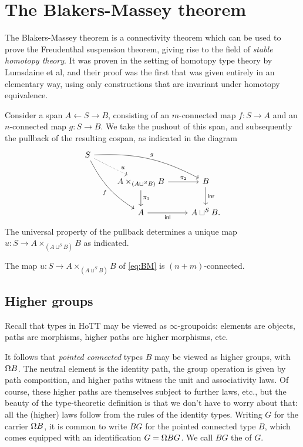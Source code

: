 
\section{The Blakers-Massey theorem}
The Blakers-Massey theorem is a connectivity theorem which can be used to prove the Freudenthal suspension theorem, giving rise to the field of \emph{stable homotopy theory}. It was proven in the setting of homotopy type theory by Lumsdaine et al, and their proof was the first that was given entirely in an elementary way, using only constructions that are invariant under homotopy equivalence. 

Consider a span $A \leftarrow S \rightarrow B$, consisting of an $m$-connected map $f:S\to A$ and an $n$-connected map $g:S\to B$. We take the pushout of this span, and subsequently the pullback of the resulting cospan, as indicated in the diagram
\begin{equation}\label{eq:BM}
\begin{tikzcd}
S \arrow[drr,bend left=15,"g"] \arrow[ddr,bend right=15,swap,"f"] \arrow[dr,densely dotted,"u" near end] \\
& A \times_{(A \sqcup^S B)} B \arrow[r,"\pi_2"] \arrow[d,"\pi_1"] & B \arrow[d,"\inr"] \\
& A \arrow[r,swap,"\inl"] & A \sqcup^S B.
\end{tikzcd}
\end{equation}
The universal property of the pullback determines a unique map $u:S\to A \times_{(A\sqcup^S B)} B$ as indicated.

\begin{thm}
The map $u:S\to A \times_{(A\sqcup^S B)} B$ of \cref{eq:BM} is $(n+m)$-connected.
\end{thm}

\subsection{Higher groups}
\label{sec:higher-groups}

Recall that types in HoTT may be viewed as $\infty$-groupoids:
elements are objects, paths are morphisms, higher paths are higher
morphisms, etc.

It follows that \emph{pointed connected} types $B$ may be viewed as higher
groups, with  $\Omega B$.
The neutral element is the identity path,
the group operation is given by path composition,
and higher paths witness the unit and associativity laws.
Of course, these higher paths are themselves subject to further laws,
etc., but the beauty of the type-theoretic definition is
that we don't have to worry about that:
all the (higher) laws follow from the rules of the identity types.
Writing $G$ for the carrier $\Omega B$, it is common to write $BG$ for the pointed
connected type $B$, which comes equipped with an identification $G = \Omega BG$.
We call $BG$ the  of $G$.

